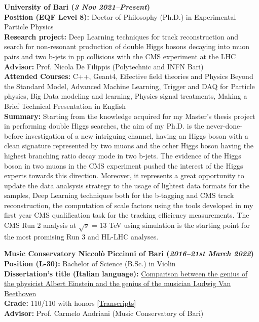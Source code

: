 \documentclass[11pt]{res}
\begin{document}
\newcommand{\DOI}[1]{\href{https://doi.org/#1}{doi:#1}}
\begin{resume}

\textbf{University of Bari (\textit{3 Nov 2021--Present})}\\
\textbf{Position (EQF Level 8):} Doctor of Philosophy (Ph.D.) in Experimental Particle Physics\\
\textbf{Research project:}
Deep Learning techniques for track reconstruction and search for non-resonant production of double Higgs bosons decaying into muon pairs and two b-jets in pp collisions with the CMS experiment at the LHC\\
\textbf{Advisor:} Prof. Nicola De Filippis (Polytechnic and INFN Bari)\\
\textbf{Attended Courses:} C++, Geant4, Effective field theories and Physics Beyond the Standard Model, Advanced Machine Learning, Trigger and DAQ for Particle physics, Big Data modeling and learning, Physics signal treatments, Making a Brief Technical Presentation in English\\
\textbf{Summary:} Starting from the knowledge acquired for my Master's thesis project in performing double Higgs searches, the aim of my Ph.D. is the never-done-before investigation of a new intriguing channel, having an Higgs boson with a clean signature represented by two muons and the other Higgs boson having the highest branching ratio decay mode in two b-jets. The evidence of the Higgs boson in two muons in the CMS experiment pushed the interest of the Higgs experts towards this direction. Moreover, it represents a great opportunity to update the data analsysis strategy to the usage of lightest data formats for the samples, Deep Learning techniques both for the b-tagging and CMS track reconstruction, the computation of scale factors using the tools developed in my first year CMS qualification task for the tracking efficiency measurements. The CMS Run 2 analysis at $\sqrt{s}$ = 13 TeV using simulation is the starting point for the most promising Run 3 and HL-LHC analyses. 

\textbf{Music Conservatory Niccolò Piccinni of Bari (\textit{2016--21st March 2022})}\\
\textbf{Position (L-30):} Bachelor of Science (B.Sc.) in Violin\\
\textbf{Dissertation's title (Italian language):}
\href{https://drive.google.com/file/d/1D4PbAL-X92U5CsQO8JGemSHA03GEtdu0/view?usp=share_link}{Comparison between the genius of the physicist Albert Einstein and the genius of the musician Ludwig Van Beethoven}\\
\textbf{Grade:} 110/110 with honors [\href{https://drive.google.com/file/d/1aV1ERPqgSpQ-9SRbWIpw-Q4BkuS1kvyy/view?usp=share_link}{Transcripts}]\\
\textbf{Advisor:} Prof. Carmelo Andriani (Music Conservatory of Bari)


\end{resume}
\end{document}

